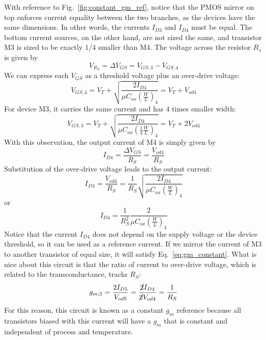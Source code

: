 With reference to Fig.~\ref{fig:constant_gm_ref}, notice that the PMOS mirror on top enforces current equality between the two branches, as the devices have the same dimensions.  In other words, the currents $I_{D3}$ and $I_{D4}$ must be equal.  The bottom current sources, on the other hand, are not sized the same, and transistor M3 is sized to be exactly $1/4$ smaller than M4.  The voltage across the resistor $R_s$ is given by
    \begin{equation}
        V_{R_S} = \Delta V_{GS} = V_{GS,3} - V_{GS,4}
    \end{equation}
We can express each $V_{GS}$ as a threshold voltage plus an over-drive voltage:
    \begin{equation}
        V_{GS,4} = V_T + \sqrt{\frac{2 I_{D4}}{\mu C_{ox} \left( \frac{W}{L} \right)_4}} = V_T + V_{od4}
    \end{equation}
For device M3, it carries the same current and has 4 times smaller width:
    \begin{equation}
        V_{GS,3} = V_T + \sqrt{\frac{2 I_{D4}}{\mu C_{ox} \left( \frac{1}{4} \frac{W}{L} \right)_4}} = V_T + 2V_{od4}
    \end{equation}
With this observation, the output current of M4 is simply given by
    \begin{equation}
        I_{D4} = \frac{\Delta V_{GS}}{R_S} = \frac{V_{od4}}{R_S}  \label{eq:gm_constant}
    \end{equation}
Substitution of the over-drive voltage leads to the output current:
    \begin{equation}
        I_{D4} = \frac{V_{od4}}{R_S} = \frac{1}{R_S} \sqrt{\frac{2 I_{D4}}{\mu C_{ox} \left( \frac{W}{L} \right)_4}}
    \end{equation}
or
    \begin{equation}
        I_{D4} = \frac{1}{R_S^2} \frac{2}{\mu C_{ox} \left( \frac{W}{L} \right)_4}
    \end{equation}	
Notice that the current $I_{D4}$ does not depend on the supply voltage or the device threshold, so it can be used as a reference current.  If we mirror the current of M3 to another transistor of equal size, it will satisfy Eq.~\ref{eq:gm_constant}.  What is nice about this circuit is that the ratio of current to over-drive voltage, which is related to the transconductance, tracks $R_S$:
    \begin{equation}
        g_{m,5} = \frac{2 I_{D5}}{V_{od5}} = \frac{\cancel{2} I_{D4}}{\cancel{2} V_{od4}} = \frac{1}{R_S} 
    \end{equation}
For this reason, this circuit is known as a constant $g_m$ reference because all transistors biased with this current will have a $g_m$ that is constant and independent of process and temperature.
